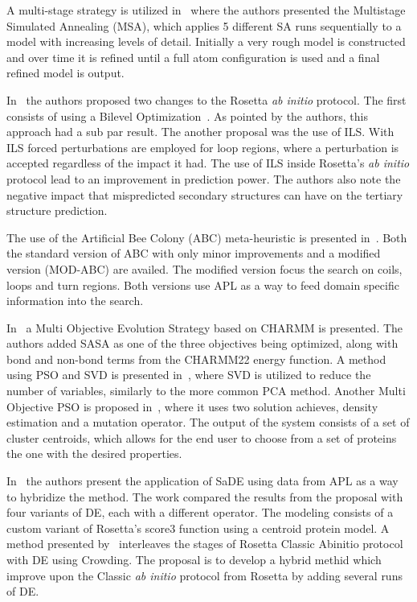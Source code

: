 A multi-stage strategy is utilized in~\cite{silva2018multistage} where the authors
presented the Multistage Simulated Annealing (MSA), which applies 5 different
SA runs sequentially to a model with increasing levels of detail. Initially a
very rough model is constructed and over time it is refined until a full atom
configuration is used and a final refined model is output.

In~\cite{kandathil2018improved} the authors proposed two changes to the Rosetta
\textit{ab initio} protocol. The first consists of using a Bilevel
Optimization~\cite{sinha2018review}. As pointed by the authors, this approach had
a sub par result. The another proposal was the use of \ac{ILS}. With ILS forced
perturbations are employed for loop regions, where a perturbation is accepted
regardless of the impact it had. The use of \ac{ILS} inside Rosetta's
\textit{ab initio} protocol lead to an improvement in prediction power.
The authors also note the negative impact that mispredicted secondary structures
can have on the tertiary structure prediction.

The use of the Artificial Bee Colony (ABC) meta-heuristic is presented
in~\cite{correa2018knowledge}. Both the standard version of ABC with only
minor improvements and a modified version (MOD-ABC) are availed.
The modified version focus the search on coils, loops and turn regions. Both versions
use \ac{APL} as a way to feed domain specific information into the search.

In~\cite{gao2018incorporation} a Multi Objective Evolution Strategy based on
CHARMM is presented. The authors added \ac{SASA} as one of the three objectives
being optimized, along with bond and non-bond terms from the CHARMM22 energy
function. A method using \ac{PSO} and \ac{SVD} is presented in~\cite{alvarez2018protein},
where \ac{SVD} is utilized to reduce the number of variables, similarly to the
more common \ac{PCA} method. Another Multi Objective \ac{PSO} is proposed
in~\cite{song2018adoption}, where it uses two solution achieves, density estimation
and a mutation operator. The output of the system consists of a set of cluster
centroids, which allows for the end user to choose from a set of proteins the
one with the desired properties.

In~\cite{narloch2019knowledge} the authors present the application of \ac{SaDE}
using data from \ac{APL} as a way to hybridize the method. The work compared the
results from the proposal with four variants of \ac{DE}, each with a different
operator. The modeling consists of a custom variant of Rosetta's score3 function
using a centroid protein model. A method presented by~\cite{varela2019crowding}
interleaves the stages of Rosetta Classic Abinitio protocol with \ac{DE} using
Crowding. The proposal is to develop a hybrid methid which improve upon the
Classic \textit{ab initio} protocol from Rosetta by adding several runs of \ac{DE}.

